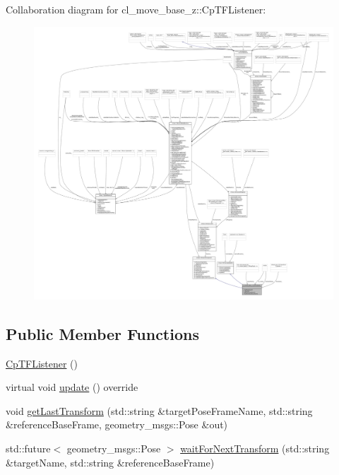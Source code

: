 Collaboration diagram for cl\+\_\+move\+\_\+base\+\_\+z\+:\+:Cp\+T\+F\+Listener\+:
\nopagebreak
\begin{figure}[H]
\begin{center}
\leavevmode
\includegraphics[width=350pt]{classcl__move__base__z_1_1CpTFListener__coll__graph}
\end{center}
\end{figure}
\subsection*{Public Member Functions}
\begin{DoxyCompactItemize}
\item 
\hyperlink{classcl__move__base__z_1_1CpTFListener_a4379d3a0b3d67ffbb0741688bf39dda5}{Cp\+T\+F\+Listener} ()
\item 
virtual void \hyperlink{classcl__move__base__z_1_1CpTFListener_a0bdf03c329aab2ea038b67e51996a515}{update} () override
\item 
void \hyperlink{classcl__move__base__z_1_1CpTFListener_aad004e766d7a922129bd4b0b6320ea47}{get\+Last\+Transform} (std\+::string \&target\+Pose\+Frame\+Name, std\+::string \&reference\+Base\+Frame, geometry\+\_\+msgs\+::\+Pose \&out)
\item 
std\+::future$<$ geometry\+\_\+msgs\+::\+Pose $>$ \hyperlink{classcl__move__base__z_1_1CpTFListener_a26977736e54c6f00e55e3b8e7247fa85}{wait\+For\+Next\+Transform} (std\+::string \&target\+Name, std\+::string \&reference\+Base\+Frame)
\end{DoxyCompactItemize}
